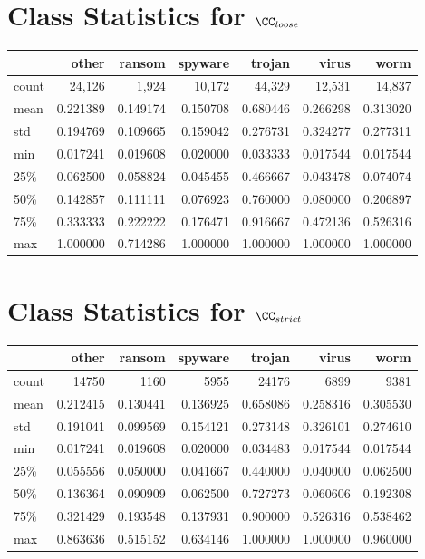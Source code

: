 \section{Class Statistics for $\CC_{loose}$}
\begin{tabular}{lrrrrrr}
	\toprule
	{} &         other &       ransom &       spyware &        trojan &         virus &          worm \\
	\midrule
	count &  24,126 &  1,924 &  10,172 &  44,329 &  12,531 &  14,837 \\
	mean  &      0.221389 &     0.149174 &      0.150708 &      0.680446 &      0.266298 &      0.313020 \\
	std   &      0.194769 &     0.109665 &      0.159042 &      0.276731 &      0.324277 &      0.277311 \\
	min   &      0.017241 &     0.019608 &      0.020000 &      0.033333 &      0.017544 &      0.017544 \\
	25\%   &      0.062500 &     0.058824 &      0.045455 &      0.466667 &      0.043478 &      0.074074 \\
	50\%   &      0.142857 &     0.111111 &      0.076923 &      0.760000 &      0.080000 &      0.206897 \\
	75\%   &      0.333333 &     0.222222 &      0.176471 &      0.916667 &      0.472136 &      0.526316 \\
	max   &      1.000000 &     0.714286 &      1.000000 &      1.000000 &      1.000000 &      1.000000 \\
	\bottomrule
\end{tabular}

\section{Class Statistics for $\CC_{strict}$}
\begin{tabular}{lrrrrrr}
	\toprule
	{} &         other &       ransom &      spyware &        trojan &        virus &         worm \\
	\midrule
	count &  14750 &  1160 &  5955 &  24176 &  6899 &  9381 \\
	mean  &      0.212415 &     0.130441 &     0.136925 &      0.658086 &     0.258316 &     0.305530 \\
	std   &      0.191041 &     0.099569 &     0.154121 &      0.273148 &     0.326101 &     0.274610 \\
	min   &      0.017241 &     0.019608 &     0.020000 &      0.034483 &     0.017544 &     0.017544 \\
	25\%   &      0.055556 &     0.050000 &     0.041667 &      0.440000 &     0.040000 &     0.062500 \\
	50\%   &      0.136364 &     0.090909 &     0.062500 &      0.727273 &     0.060606 &     0.192308 \\
	75\%   &      0.321429 &     0.193548 &     0.137931 &      0.900000 &     0.526316 &     0.538462 \\
	max   &      0.863636 &     0.515152 &     0.634146 &      1.000000 &     1.000000 &     0.960000 \\
	\bottomrule
\end{tabular}


